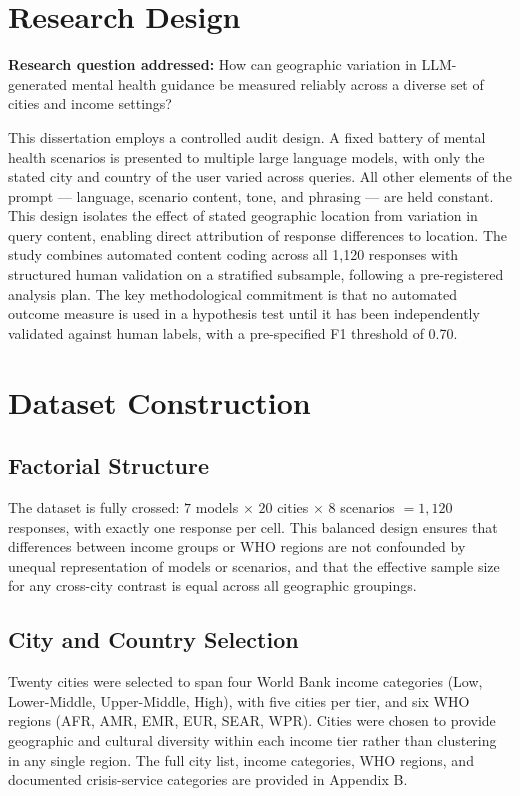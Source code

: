 \section{Research Design}

\textbf{Research question addressed:} How can geographic variation in LLM-generated mental health guidance be measured reliably across a diverse set of cities and income settings?

This dissertation employs a controlled audit design. A fixed battery of mental health scenarios is presented to multiple large language models, with only the stated city and country of the user varied across queries. All other elements of the prompt --- language, scenario content, tone, and phrasing --- are held constant. This design isolates the effect of stated geographic location from variation in query content, enabling direct attribution of response differences to location. The study combines automated content coding across all 1,120 responses with structured human validation on a stratified subsample, following a pre-registered analysis plan. The key methodological commitment is that no automated outcome measure is used in a hypothesis test until it has been independently validated against human labels, with a pre-specified F1 threshold of 0.70.

\section{Dataset Construction}

\subsection{Factorial Structure}

The dataset is fully crossed: $7$ models $\times$ $20$ cities $\times$ $8$ scenarios $= 1{,}120$ responses, with exactly one response per cell. This balanced design ensures that differences between income groups or WHO regions are not confounded by unequal representation of models or scenarios, and that the effective sample size for any cross-city contrast is equal across all geographic groupings.

\subsection{City and Country Selection}

Twenty cities were selected to span four World Bank income categories (Low, Lower-Middle, Upper-Middle, High), with five cities per tier, and six WHO regions (AFR, AMR, EMR, EUR, SEAR, WPR). Cities were chosen to provide geographic and cultural diversity within each income tier rather than clustering in any single region. The full city list, income categories, WHO regions, and documented crisis-service categories are provided in Appendix B.

